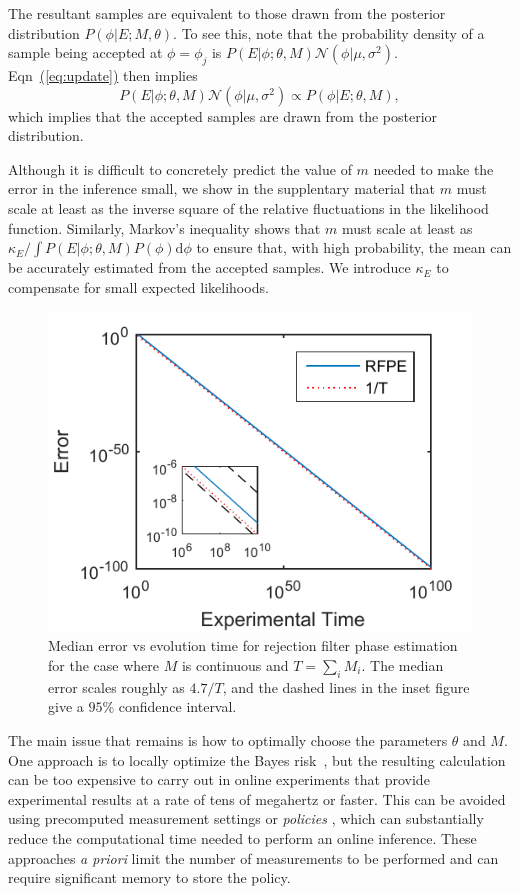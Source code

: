 \documentclass[aps,prl,amsmath,twocolumn,amssymb,superscriptaddress]{revtex4-1}
\newcommand{\eq}[1]{\hyperref[eq:#1]{(\ref*{eq:#1})}}
\newcommand{\app}[1]{the supplentary material}
\begin{document}
The resultant samples are equivalent to those drawn from the posterior distribution
$P(\phi|E;M,\theta)$.  To see this, note that the probability density of a sample being accepted at $\phi=\phi_j$ is $ P(E | \phi; \theta, M) \mathcal{N}(\phi|\mu,\sigma^2)$.  Eqn~\eq{update} then implies 
\begin{equation}
    P(E | \phi; \theta, M) \mathcal{N}(\phi|\mu,\sigma^2) \propto P(\phi | E; \theta, M),
\end{equation}
which implies that the accepted samples are drawn from the posterior distribution.  

Although it is difficult to concretely predict the value of $m$ needed to make the error in the inference small, we show in \app{stability} that $m$ must scale at least as the inverse square of the relative fluctuations in the likelihood function.  Similarly, Markov's inequality shows that $m$ must scale at least as $\kappa_E/\int P(E|\phi;\theta,M)P(\phi) \mathrm{d}\phi$ to ensure that, with high probability, the mean can be accurately estimated from the accepted samples.  We introduce $\kappa_E$ to compensate for small expected likelihoods.

\begin{figure}[t!]
\includegraphics[width=0.8\linewidth]{Longpet2.pdf}
\caption{Median error vs evolution time for rejection filter phase estimation for the case where $M$ is continuous and $T=\sum_i M_i$.  The median error scales roughly as $4.7/T$, and the dashed lines in the inset figure give a $95\%$ confidence interval.}\label{fig:rms}
\end{figure}

The main issue that remains is how to optimally choose the parameters $\theta$
and $M$. One approach is to locally optimize the Bayes
risk~\cite{granade_robust_2012}, but the resulting calculation can be too
expensive to carry out in online experiments that provide experimental results
at a rate of tens of megahertz or faster.
This can be avoided using precomputed
measurement settings
\cite{sergeevich_characterization_2011}
or \emph{policies} \cite{hentschel_machine_2010,hayes_swarm_2014}, which
can substantially reduce the computational time needed to perform an online inference. These approaches \emph{a priori} limit the number of measurements to
be performed and can require significant memory to store the policy.
\end{document}
